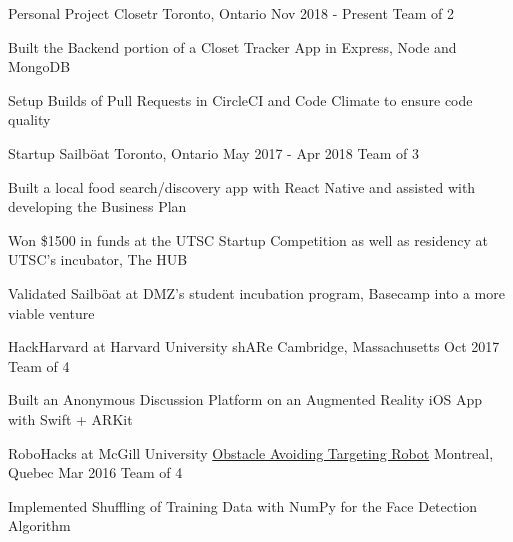 \begin{cventries}
\cventry
    {Personal Project}
    {Closetr}
    {Toronto, Ontario}
    {Nov 2018 - Present}
    {Team of 2}
    {
      \begin{cvitems}
        \item{Built the Backend portion of a Closet Tracker App in Express, Node and MongoDB}
        \item{Setup Builds of Pull Requests in CircleCI and Code Climate to ensure code quality}
      \end{cvitems}
    }
\cventry
  {Startup}
  {Sailböat}
  {Toronto, Ontario}
  {May 2017 - Apr 2018}
  {Team of 3}
  {
    \begin{cvitems}
      \item {Built a local food search/discovery app with React Native and assisted with developing the Business Plan}
      \item {Won \$1500 in funds at the UTSC Startup Competition as well as residency at UTSC's incubator, The HUB}
      \item {Validated Sailböat at DMZ's student incubation program, Basecamp into a more viable venture}
    \end{cvitems}
  }
\cventry
  {HackHarvard at Harvard University}
  {shARe}
  {Cambridge, Massachusetts}
  {Oct 2017}
  {Team of 4}
  {
    \begin{cvitems}
      \item {Built an Anonymous Discussion Platform on an Augmented Reality iOS App with Swift + ARKit}
    \end{cvitems}
  }
\cventry
  {RoboHacks at McGill University}
  {\href{https://github.com/PhABC/HeadHunterBots}{Obstacle Avoiding Targeting Robot}}
  {Montreal, Quebec}
  {Mar 2016}
  {Team of 4}
  {
    \begin{cvitems}
      \item {Implemented Shuffling of Training Data with NumPy for the Face Detection Algorithm}
    \end{cvitems}
  }
\end{cventries}
